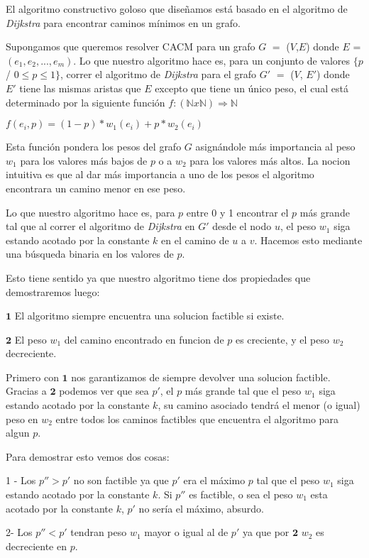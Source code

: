 El algoritmo constructivo goloso que diseñamos está basado en el algoritmo de \emph{Dijkstra} para encontrar caminos mínimos en un grafo. 

Supongamos que queremos resolver CACM para un grafo $G$ $=$ ($V$,$E$) donde $E$ = $(e_1, e_2, ..., e_m)$. Lo que nuestro algoritmo hace es, para un conjunto de valores $\{p$ / $0 \leq p \leq 1\}$, correr el algoritmo de \emph{Dijkstra} para el grafo $G'$ $=$ ($V$, $E'$) donde $E'$ tiene las mismas aristas que $E$ excepto que tiene un único peso, el cual está determinado por la siguiente función $f: (\mathbb{N} x \mathbb{N}) \Rightarrow \mathbb{N}$

$f(e_i,p) = (1-p)*w_1(e_i) + p*w_2(e_i)$

Esta función pondera los pesos del grafo $G$ asignándole más importancia al peso $w_1$ para los valores más bajos de $p$ o a $w_2$ para los valores más altos. La nocion intuitiva es que al dar m\'as importancia a uno de los pesos el algoritmo encontrara un camino menor en ese peso.

Lo que nuestro algoritmo hace es, para $p$ entre 0 y 1 encontrar el $p$ más grande tal que al correr el algoritmo de \emph{Dijkstra} en $G'$ desde el nodo $u$, el peso $w_1$ siga estando acotado por la constante $k$ en el camino de $u$ a $v$. Hacemos esto mediante una búsqueda binaria en los valores de $p$.

Esto tiene sentido ya que nuestro algoritmo tiene dos propiedades que demostraremos luego:

$\mathbf{1}$ El algoritmo siempre encuentra una solucion factible si existe.

$\mathbf{2}$ El peso $w_1$ del camino encontrado en funcion de $p$ es creciente, y el peso $w_2$ decreciente.

Primero con $\mathbf{1}$ nos garantizamos de siempre devolver una solucion factible.
Gracias a $\mathbf{2}$ podemos ver que sea $p'$, el $p$ más grande tal que el peso $w_1$ siga estando acotado por la constante $k$, su camino asociado tendrá el menor (o igual) peso en $w_2$ entre todos los caminos factibles que encuentra el algoritmo para algun $p$.

Para demostrar esto vemos dos cosas:

1 - Los $p'' > p'$ no son factible ya que $p'$ era el m\'aximo $p$  tal que el peso $w_1$ siga estando acotado por la constante $k$. Si $p''$ es factible, o sea el peso $w_1$ esta acotado por la constante $k$, $p'$ no ser\'ia el m\'aximo, absurdo.

2- Los $p'' < p'$ tendran peso $w_1$ mayor o igual al de $p'$ ya que por $\mathbf{2}$ $w_2$ es decreciente en $p$.


